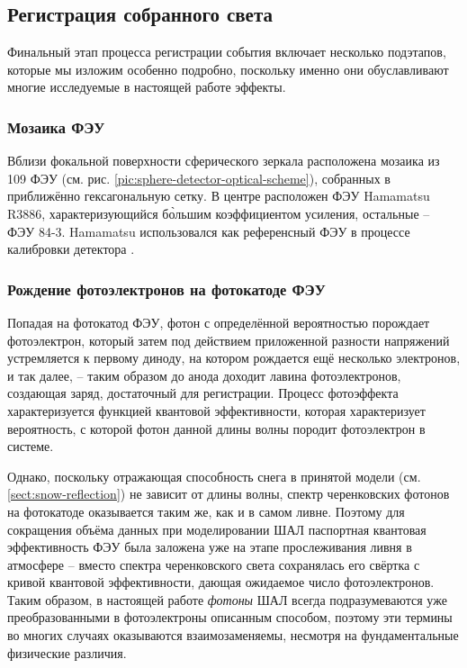 \subsection{Регистрация собранного света}

Финальный этап процесса регистрации события включает несколько подэтапов, которые мы изложим особенно подробно, поскольку именно они обуславливают многие исследуемые в настоящей работе эффекты.

\subsubsection{Мозаика ФЭУ}
\label{sec:pmt-mosaic-details}

Вблизи фокальной поверхности сферического зеркала расположена мозаика из 109 ФЭУ (см. рис. \ref{pic:sphere-detector-optical-scheme}), собранных в приближённо гексагональную сетку. В центре расположен ФЭУ Hamamatsu R3886, характеризующийся б\`{о}льшим коэффициентом усиления, остальные -- ФЭУ 84-3. Hamamatsu использовался как референсный ФЭУ в процессе калибровки детектора \cite{SphereCalibration2016}.

\subsubsection{Рождение фотоэлектронов на фотокатоде ФЭУ}

\label{sec:photon-to-phels-conversion}

Попадая на фотокатод ФЭУ, фотон с определённой вероятностью порождает фотоэлектрон, который затем под действием приложенной разности напряжений устремляется к первому диноду, на котором рождается ещё несколько электронов, и так далее, -- таким образом до анода доходит лавина фотоэлектронов, создающая заряд, достаточный для регистрации. Процесс фотоэффекта характеризуется функцией квантовой эффективности, которая характеризует вероятность, с которой фотон данной длины волны породит фотоэлектрон в системе.

Однако, поскольку отражающая способность снега в принятой модели (см. \ref{sect:snow-reflection}) не зависит от длины волны, спектр черенковских фотонов на фотокатоде оказывается таким же, как и в самом ливне. Поэтому для сокращения объёма данных при моделировании ШАЛ паспортная квантовая эффективность ФЭУ была заложена уже на этапе прослеживания ливня в атмосфере -- вместо спектра черенковского света сохранялась его свёртка с кривой квантовой эффективности, дающая ожидаемое число фотоэлектронов. Таким образом, в настоящей работе \textit{фотоны} ШАЛ всегда подразумеваются уже преобразованными в фотоэлектроны описанным способом, поэтому эти термины во многих случаях оказываются взаимозаменяемы, несмотря на фундаментальные физические различия.

